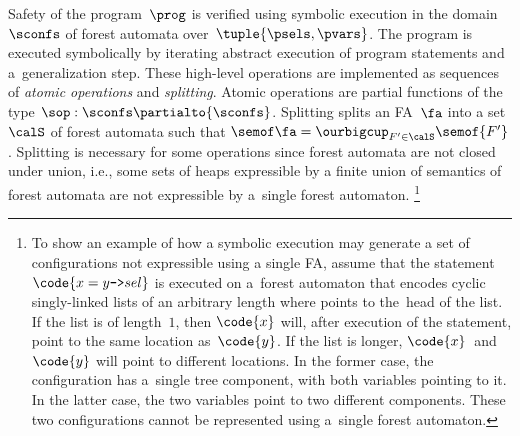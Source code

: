 Safety of the program~$\prog$ is verified using symbolic execution in the
domain~$\sconfs$ of forest automata over~$\tuple{\psels,\pvars}$.
%
The program is executed symbolically by iterating abstract execution of program statements and 
a~generalization step.
%
%
These high-level operations
are implemented as sequences of \emph{atomic operations} and \emph{splitting}.
Atomic operations are partial functions of the type $\sop:\sconfs\partialto {\sconfs}$.
%
Splitting splits an FA~$\fa$ into a set $\calS$ of forest automata such that $\semof\fa =\ourbigcup_{F' \in \calS} \semof{F'}$.
%
Splitting is necessary for some operations since forest automata are not
closed under union, i.e.,
some sets of heaps expressible by a finite union of semantics of forest automata 
are not expressible by a~single forest automaton.%
%
\footnote{
To show an example of how a symbolic execution may generate a set of configurations not expressible using a single FA, assume that the statement $\code{x = y\text{\texttt{->}}sel}$ is
executed on a~forest automaton that encodes
cyclic singly-linked lists of an arbitrary length where  points to
the~head of the list.
%
If the list is of length~$1$, then $\code{x}$ will, after execution of the
statement, point to the same location
as~$\code{y}$.
If the list is longer, $\code{x}$~and~$\code{y}$ will point to different
locations.
%
In the former case, the configuration has a~single tree component, with both variables pointing to it.
In the latter case, the two variables point to two different components.
%
These two configurations cannot be represented using a~single forest automaton.
}


